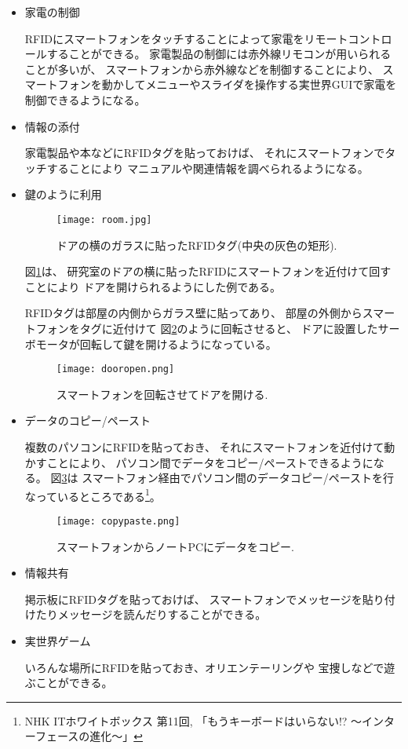 \documentclass[a4j,11pt,twocolumn]{jarticle}
\def\SP{スマートフォン}
\begin{document}
\begin{itemize}
\item 家電の制御

RFIDに{\SP}をタッチすることによって家電をリモートコントロールすることができる。
家電製品の制御には赤外線リモコンが用いられることが多いが、
{\SP}から赤外線などを制御することにより、
{\SP}を動かしてメニューやスライダを操作する実世界GUIで家電を制御できるようになる。

\item 情報の添付

家電製品や本などにRFIDタグを貼っておけば、
それに{\SP}でタッチすることにより
マニュアルや関連情報を調べられるようになる。

\item 鍵のように利用

\begin{figure}[b]
\centering
\texttt{[image: room.jpg]}
\caption{ドアの横のガラスに貼ったRFIDタグ(中央の灰色の矩形).}
\label{room}
\end{figure}

図\ref{room}は、
研究室のドアの横に貼ったRFIDに{\SP}を近付けて回すことにより
ドアを開けられるようにした例である。

RFIDタグは部屋の内側からガラス壁に貼ってあり、
部屋の外側から{\SP}をタグに近付けて
図\ref{dooropen}のように回転させると、
ドアに設置したサーボモータが回転して鍵を開けるようになっている。

\begin{figure}[h]
\centering
\texttt{[image: dooropen.png]}
\caption{{\SP}を回転させてドアを開ける.}
\label{dooropen}
\end{figure}

\item データのコピー/ペースト

複数のパソコンにRFIDを貼っておき、
それに{\SP}を近付けて動かすことにより、
パソコン間でデータをコピー/ペーストできるようになる。
図\ref{copypaste}は
{\SP}経由でパソコン間のデータコピー/ペーストを行なっているところである\footnote{
  NHK ITホワイトボックス 第11回, 「もうキーボードはいらない!? ～インターフェースの進化～」
}。

\begin{figure}[hb]
\centering
\texttt{[image: copypaste.png]}
\caption{{\SP}からノートPCにデータをコピー.}
\label{copypaste}
\end{figure}

\item 情報共有

掲示板にRFIDタグを貼っておけば、
{\SP}でメッセージを貼り付けたりメッセージを読んだりすることができる。

\item 実世界ゲーム

いろんな場所にRFIDを貼っておき、オリエンテーリングや
宝捜しなどで遊ぶことができる。

\end{itemize}
\end{document}
